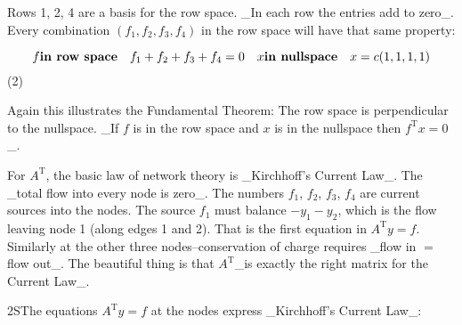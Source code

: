 Rows 1, 2, 4 are a basis for the row space. _In each row the entries add to zero_. Every combination \((f_{1},f_{2},f_{3},f_{4})\) in the row space will have that same property:

\[f\text{\bf in row space}\quad f_{1}+f_{2}+f_{3}+f_{4}=0\quad x\text{\bf in nullspace}\quad x=c(1,1,1,1)\] (2)

Again this illustrates the Fundamental Theorem: The row space is perpendicular to the nullspace. _If \(f\) is in the row space and \(x\) is in the nullspace then \(f^{\text{T}}x=0\)_.

For \(A^{\text{T}}\), the basic law of network theory is _Kirchhoff's Current Law_. The _total flow into every node is zero_. The numbers \(f_{1}\), \(f_{2}\), \(f_{3}\), \(f_{4}\) are current sources into the nodes. The source \(f_{1}\) must balance \(-y_{1}-y_{2}\), which is the flow leaving node 1 (along edges 1 and 2). That is the first equation in \(A^{\text{T}}y=f\). Similarly at the other three nodes--conservation of charge requires _flow in \(=\) flow out_. The beautiful thing is that \(A^{\text{T}}\)_is exactly the right matrix for the Current Law_.

2SThe equations \(A^{\text{T}}y=f\) at the nodes express _Kirchhoff's Current Law_: 